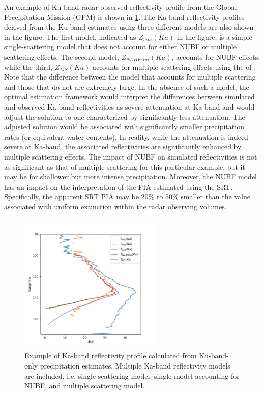 \documentclass[10pt]{ietbook}
\begin{document}
An example of Ku-band radar observed reflectivity profile from the Global Precipitation Mission (GPM) \cite{gail2017} is shown in \ref{fig:NUBF}.  
The Ka-band reflectivity profiles derived from the Ku-band
estimates using three different models are also shown in the figure.  The first model, indicated as $Z_{sim}(Ka)$ in the figure, is a simple single-scattering 
model that does not account for either NUBF or multiple scattering effects.  The second model, $Z_{NUBFsim}(Ka)$, accounts for NUBF effects, while the third,
$Z_{MS}(Ka)$ accounts for multiple scattering effects using the of \cite{hogan2008}.  Note that the difference between the model that accounts 
for multiple scattering and those that do not
are extremely large.  In the absence of such a model, the optimal estimation framework would interpret the differences between simulated and observed Ka-band
reflectivities as severe attenuation at Ka-band and would adjust the solution to one characterized by significantly less attenuation.  The adjusted solution
would be associated with significantly smaller precipitation rates (or equivalent water contents).  In reality, while the attenuation is indeed severe at 
Ka-band, the associated reflectivities are significantly enhanced by multiple scattering effects.  The impact of NUBF on simulated reflectivities is not 
as significant as that of multiple scattering for this particular example, but it may be for shallower but more intense precipitation.  Moreover, the NUBF
model has an impact on the interpretation of the PIA estimated using the SRT.  Specifically, the apparent SRT PIA may be 20\% to 50\% smaller than the value
associated with uniform extinction within the radar observing volumes.

\begin{figure}  \label{fig:NUBF}
\centering
    \centerline{ }
    \includegraphics[width=0.6\textwidth]{retrievedZKa.png}
    
    \caption{Example of Ka-band reflectivity profile calculated from  Ku-band-only precipitation estimates. Multiple Ka-band reflectivity models are
    included, i.e. single scattering model, single model accounting for NUBF, and multiple scattering model.}
\end{figure}
\end{document}
